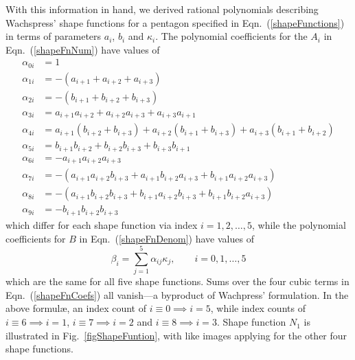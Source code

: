 With this information in hand, we derived rational polynomials describing Wachspress' shape functions for a pentagon specified in Eqn.~(\ref{shapeFunctions}) in terms of parameters $a_i$, $b_i$ and $\kappa_i$.  The polynomial coefficients for the $A_i$ in Eqn.~(\ref{shapeFnNum}) have values of
\begin{subequations}
	\label{shapeFnCoefs}
	\begin{align}
	\alpha_{0i} & = 1 \\
	\alpha_{1i} & = -( a_{i+1} + a_{i+2} + a_{i+3} ) \\
	\alpha_{2i} & = -( b_{i+1} + b_{i+2} + b_{i+3} ) \\
	\alpha_{3i} & = a_{i+1} a_{i+2} + a_{i+2} a_{i+3} + a_{i+3} a_{i+1} \\
	\alpha_{4i} & = a_{i+1} ( b_{i+2} + b_{i+3} ) + a_{i+2} ( b_{i+1} + 
	b_{i+3} ) + a_{i+3} ( b_{i+1} + b_{i+2} ) \\
	\alpha_{5i} & = b_{i+1} b_{i+2} + b_{i+2} b_{i+3} + b_{i+3} b_{i+1} \\
	\alpha_{6i} & = -a_{i+1} a_{i+2} a_{i+3} \\
	\alpha_{7i} & = -( a_{i+1} a_{i+2} b_{i+3} + a_{i+1} b_{i+2} a_{i+3} + 
	b_{i+1} a_{i+2} a_{i+3} ) \\
	\alpha_{8i} & = -( a_{i+1} b_{i+2} b_{i+3} + b_{i+1} a_{i+2} b_{i+3} + 
	b_{i+1} b_{i+2} a_{i+3} ) \\
	\alpha_{9i} & = -b_{i+1} b_{i+2} b_{i+3}
	\end{align}
\end{subequations}
which differ for each shape function via index $i = 1,2,\dots,5$, while the polynomial coefficients for $B$ in Eqn.~(\ref{shapeFnDenom}) have values of
\begin{equation}
\beta_i = \sum_{j=1}^5 \alpha_{ij} \kappa_j, \qquad i = 0, 1, \dots, 5
\end{equation}
which are the same for all five shape functions.  Sums over the four cubic terms in Eqn.~(\ref{shapeFnCoefs}) all vanish---a byproduct of Wachpress' formulation.  In the above formul\ae, an index count of $i \equiv 0 \implies i = 5$, while index counts of $i \equiv 6 \implies i = 1$, $i \equiv 7 \implies i = 2$ and $i \equiv 8 \implies i = 3$.  Shape function $N_1$ is illustrated in Fig.~\ref{figShapeFuntion}, with like images applying for the other four shape functions.

